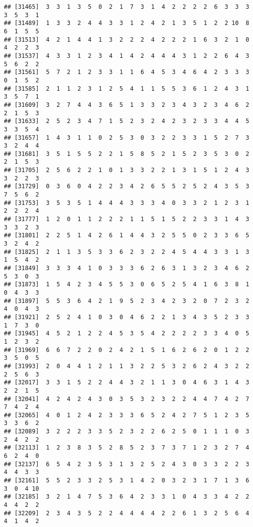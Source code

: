 \documentclass[
]{article}
\begin{document}
\begin{verbatim}
## [31465]  3  3  1  3  5  0  2  1  7  3  1  4  2  2  2  2  6  3  3  3  3  5  3  1
## [31489]  1  3  3  2  4  4  3  3  1  2  4  2  1  3  5  1  2  2 10  8  6  1  5  5
## [31513]  4  2  1  4  4  1  3  2  2  2  4  2  2  2  1  6  3  2  1  0  4  2  2  3
## [31537]  4  3  3  1  2  3  4  1  4  2  4  4  4  3  1  2  2  6  4  3  5  6  2  2
## [31561]  5  7  2  1  2  3  3  1  1  6  4  5  3  4  6  4  2  3  3  3  0  1  5  2
## [31585]  2  1  1  2  3  1  2  5  4  1  1  5  5  3  6  1  2  4  3  1  3  5  7  1
## [31609]  3  2  7  4  4  3  6  5  1  3  3  2  3  4  3  2  3  4  6  2  2  1  5  3
## [31633]  2  5  2  3  4  7  1  5  2  3  2  4  2  3  2  3  3  4  4  5  3  3  5  4
## [31657]  1  4  3  1  1  0  2  5  3  0  3  2  2  3  3  1  5  2  7  3  3  2  4  4
## [31681]  3  5  1  5  5  2  2  1  5  8  5  2  1  5  2  3  5  3  0  2  2  1  5  3
## [31705]  2  5  6  2  2  1  0  1  3  3  2  2  1  3  1  5  1  2  4  3  3  2  2  3
## [31729]  0  3  6  0  4  2  2  3  4  2  6  5  5  2  5  2  4  3  5  3  7  5  6  2
## [31753]  3  5  3  5  1  4  4  4  3  3  3  4  0  3  3  2  1  2  3  1  2  2  2  4
## [31777]  1  2  0  1  1  2  2  2  1  1  5  1  5  2  2  3  3  1  4  3  3  3  2  3
## [31801]  2  2  5  1  4  2  6  1  4  4  3  2  5  5  0  2  3  3  6  5  3  2  4  2
## [31825]  2  1  1  3  5  3  3  6  2  3  2  2  4  5  4  4  3  3  1  3  1  5  4  2
## [31849]  3  3  3  4  1  0  3  3  3  6  2  6  3  1  3  2  3  4  6  2  5  3  0  3
## [31873]  1  5  4  2  3  4  5  5  3  0  6  5  2  5  4  1  6  3  8  1  0  4  3  3
## [31897]  5  5  3  6  4  2  1  9  5  2  3  4  2  3  2  0  7  2  3  2  4  0  4  3
## [31921]  2  5  2  4  1  0  3  0  4  6  2  2  1  3  4  3  5  2  3  3  1  7  3  0
## [31945]  4  5  2  1  2  2  4  5  3  5  4  2  2  2  2  3  3  4  0  5  1  2  3  2
## [31969]  6  6  7  2  2  0  2  4  2  1  5  1  6  2  6  2  0  1  2  2  3  5  0  5
## [31993]  2  0  4  4  1  2  1  1  3  2  2  5  3  2  6  2  4  3  2  2  2  5  6  3
## [32017]  3  3  1  5  2  2  4  4  3  2  1  1  3  0  4  6  3  1  4  3  2  2  1  5
## [32041]  4  2  4  2  4  3  0  3  5  3  2  3  2  2  4  4  7  4  2  7  7  4  2  4
## [32065]  4  0  1  2  4  2  3  3  3  6  5  2  4  2  7  5  1  2  3  5  3  3  6  2
## [32089]  3  2  2  2  3  3  5  2  3  2  2  6  2  5  0  1  1  1  0  3  2  4  2  2
## [32113]  1  2  3  8  3  5  2  8  5  2  3  7  3  7  1  2  3  2  7  4  6  2  4  0
## [32137]  6  5  4  2  3  5  3  1  3  2  5  2  4  3  0  3  3  2  2  3  4  4  3  3
## [32161]  5  5  2  3  3  2  5  3  1  4  2  0  3  2  3  1  7  1  3  6  3  0  4 10
## [32185]  3  2  1  4  7  5  3  6  4  2  3  3  1  0  4  3  3  4  2  2  4  4  2  2
## [32209]  2  3  4  3  5  2  2  4  4  4  4  2  2  6  1  3  2  5  6  4  4  1  4  2

\end{verbatim}
\end{document}
